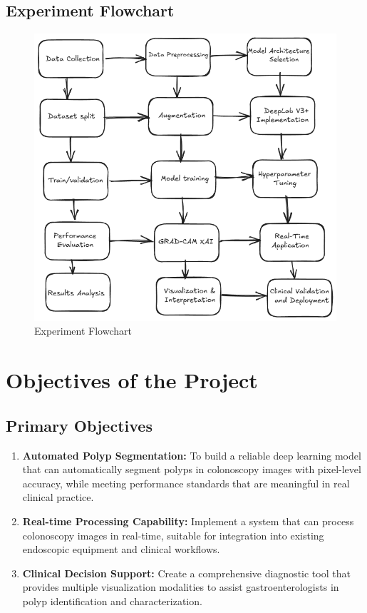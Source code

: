 \documentclass[a4paper,12pt]{report}
\begin{document}
\subsection{Experiment Flowchart}

\begin{figure}[h]
    \centering
    \includegraphics[width=\textwidth]{flowchart.png}
    \caption{Experiment Flowchart}
    \label{fig:experiment_flowchart}
\end{figure}



    \section{Objectives of the Project}
    \subsection{Primary Objectives}
\begin{enumerate}
    \item\textbf{Automated Polyp Segmentation:}
    To build a reliable deep learning model that can automatically segment polyps in colonoscopy images with pixel-level accuracy, while meeting performance standards that are meaningful in real clinical practice.
    \item\textbf{Real-time Processing Capability:}
     Implement a system that can process colonoscopy images in real-time, suitable for integration into existing endoscopic equipment and clinical workflows.
    \item\textbf{Clinical Decision Support:}
     Create a comprehensive diagnostic tool that provides multiple visualization modalities to assist gastroenterologists in polyp identification and characterization.
 \end{enumerate}
\end{document}
